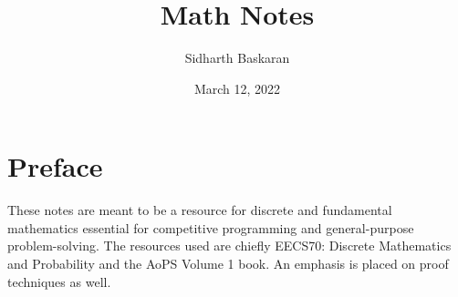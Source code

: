 \documentclass[12pt]{article}
\title{Math Notes}
\author{Sidharth Baskaran}
\date{March 12, 2022}
\begin{document}
\maketitle

\tableofcontents
\newpage

\section*{Preface}

These notes are meant to be a resource for discrete and fundamental mathematics
essential for competitive programming and general-purpose problem-solving.
The resources used are chiefly EECS70: Discrete Mathematics and Probability and the AoPS Volume 1 book.
An emphasis is placed on proof techniques as well.




\end{document}
